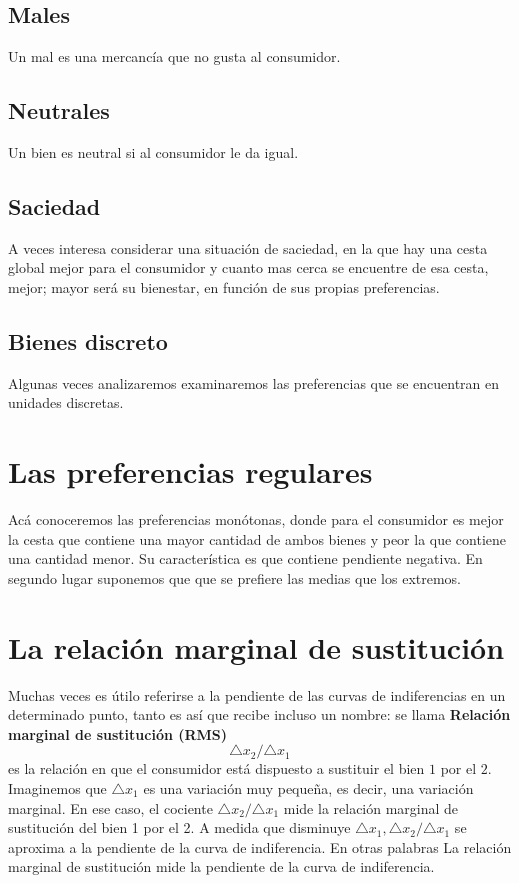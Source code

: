 \documentclass[10pt]{article}
\begin{document}
\subsection*{Males}
Un mal es una mercancía que no gusta al consumidor.

\subsection*{Neutrales}
Un bien es neutral si al consumidor le da igual.

\subsection*{Saciedad}
A veces interesa considerar una situación de saciedad, en la que hay una cesta global mejor para el consumidor y cuanto mas cerca se encuentre de esa cesta, mejor; mayor será su bienestar, en función de sus propias preferencias. 

\subsection*{Bienes discreto}
Algunas veces analizaremos examinaremos las preferencias que se encuentran en unidades discretas.

\section*{Las preferencias regulares}
Acá conoceremos las preferencias monótonas, donde para el consumidor es mejor la cesta que contiene una mayor cantidad de ambos bienes y peor la que contiene una cantidad menor. Su característica es que contiene pendiente negativa. En segundo lugar suponemos que que se prefiere las medias que los extremos.

\section*{La relación marginal de sustitución}
Muchas veces es útilo referirse a la pendiente de las curvas de indiferencias en un determinado punto, tanto es así que recibe incluso un nombre: se llama \textbf{Relación marginal de sustitución (RMS)}
$$\triangle x_2 / \triangle x_1$$
es la relación en que el consumidor está dispuesto a sustituir el bien $1$ por el $2$.\\
Imaginemos que $\triangle x_1$ es una variación muy pequeña, es decir, una variación marginal. En ese caso, el cociente $\triangle x_2 / \triangle x_1$ mide la relación marginal de sustitución del bien 1 por el 2. A medida que disminuye $\triangle x_1, \triangle x_2 / \triangle x_1$ se aproxima a la pendiente de la curva de indiferencia. En otras palabras La relación marginal de sustitución mide la pendiente de la curva de indiferencia.
\end{document}
